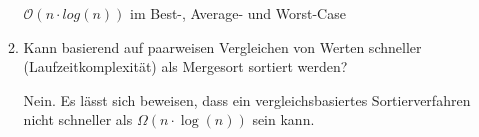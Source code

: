 \documentclass{bschlangaul-aufgabe}
\begin{document}
\begin{enumerate}
\begin{enumerate}
\begin{liAntwort}
$\mathcal{O}(n \cdot log(n))$ im Best-, Average- und Worst-Case
\end{liAntwort}

\item Kann basierend auf paarweisen Vergleichen von Werten schneller
(Laufzeitkomplexität) als Mergesort sortiert werden?

\begin{liAntwort}
Nein. Es lässt sich beweisen, dass ein vergleichsbasiertes
Sortierverfahren nicht schneller als $\Omega (n\cdot \log(n))$ sein
kann.
\end{liAntwort}
\end{enumerate}
\end{enumerate}
\end{document}
